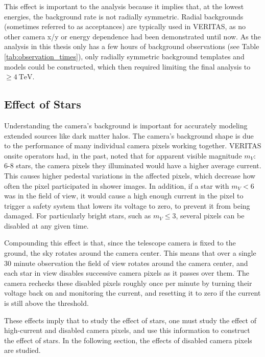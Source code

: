     This effect is important to the analysis because it implies that, at the lowest energies, the background rate is not radially symmetric.
    Radial backgrounds (sometimes referred to as acceptances) are typically used in VERITAS, as no other camera x/y or energy dependence had been demonstrated until now.
    As the analysis in this thesis only has a few hours of background observations (see Table \ref{tab:observation_times}), only radially symmetric background templates and models could be constructed, which then required limiting the final analysis to $\geq\SI{4}{\TeV{}}$.
    
    \FloatBarrier

  \subsection{Effect of Stars}
    Understanding the camera's background is important for accurately modeling extended sources like dark matter halos.
    The camera's background shape is due to the performance of many individual camera pixels working together.
    VERITAS onsite operators had, in the past, noted that for apparent visible magnitude $m_V :$ 6-8 stars, the camera pixels they illuminated would have a higher average current.
    This causes higher pedestal variations in the affected pixels, which decrease how often the pixel participated in shower images.
    In addition, if a star with $m_V < 6$ was in the field of view, it would cause a high enough current in the pixel to trigger a safety system that lowers its voltage to zero, to prevent it from being damaged.
    For particularly bright stars, such as $m_V \leq 3$, several pixels can be disabled at any given time.

    Compounding this effect is that, since the telescope camera is fixed to the ground, the sky rotates around the camera center.
    This means that over a single 30 minute observation the field of view rotates around the camera center, and each star in view disables successive camera pixels as it passes over them.
    The camera rechecks these disabled pixels roughly once per minute by turning their voltage back on and monitoring the current, and resetting it to zero if the current is still above the threshold.

    These effects imply that to study the effect of stars, one must study the effect of high-current and disabled camera pixels, and use this information to construct the effect of stars.
    In the following section, the effects of disabled camera pixels are studied.
    
